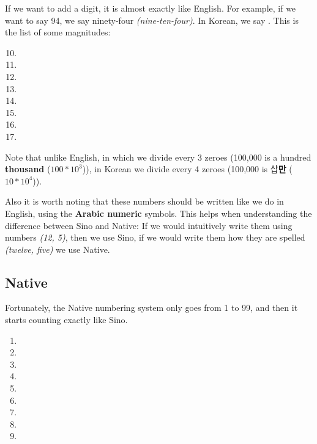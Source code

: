 If we want to add a digit, it is almost exactly like English.  
For example, if we want to say 94, we say ninety-four \textit{(nine-ten-four)}.  
In Korean, we say .  
This is the list of some magnitudes:

\begin{multicols}{4}
    \begin{enumerate}
        \setcounter{enumi}{9}
        \item {} \setcounter{enumi}{99}
        \item {} \setcounter{enumi}{999}
        \item {} \setcounter{enumi}{9999}
        \item {} \setcounter{enumi}{99999}
        \item {} \setcounter{enumi}{999999}
        \item {} \setcounter{enumi}{9999999}
        \item {} \setcounter{enumi}{99999999}
        \item {} 
    \end{enumerate}
\end{multicols}

Note that unlike English, in which we divide every 3 zeroes (100,000 is a hundred \textbf{thousand} ($100*10^3$)), in Korean we divide every 4 zeroes (100,000 is 삽\textbf{만} ($10*10^4$)).

Also it is worth noting that these numbers should be written like we do in English, using the \textbf{Arabic numeric} symbols. This helps when understanding the difference between Sino and Native: If we would intuitively write them using numbers \textit{(12, 5)}, then we use Sino, if we would write them how they are spelled \textit{(twelve, five)} we use Native.

\subsection{Native}
Fortunately, the Native numbering system only goes from 1 to 99, and then it starts counting exactly like Sino.

\begin{multicols}{5}
    \begin{enumerate}
        \item {}
        \item {}
        \item {}
        \item {}
        \item {}
        \item {}
        \item {}
        \item {}
        \item {}
    \end{enumerate}
\end{multicols}

